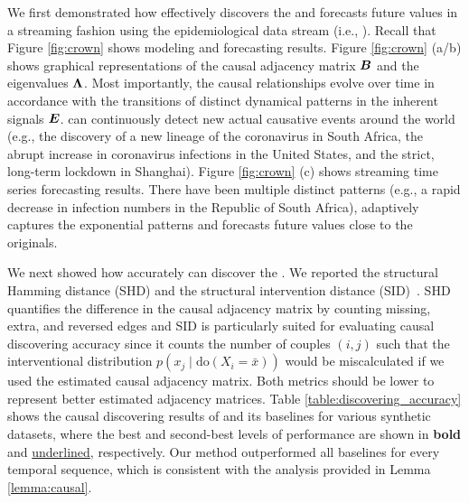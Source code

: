 We first demonstrated how effectively \method discovers the \relation and forecasts future values in a streaming fashion
using the epidemiological data stream (i.e., \covid).
Recall that Figure \ref{fig:crown} shows \method modeling and forecasting results.
Figure \ref{fig:crown} (a/b) shows graphical representations of the causal adjacency matrix $\bm{B}$ and the eigenvalues $\bm{\Lambda}$.
Most importantly, the causal relationships evolve over time in accordance with
the transitions of distinct dynamical patterns in the inherent signals $\bm{E}$.
\method can continuously detect new actual causative events around the world
(e.g., the discovery of a new lineage of the coronavirus in South Africa,
the abrupt increase in coronavirus infections in the United States,
and the strict, long-term lockdown in Shanghai).
Figure \ref{fig:crown} (c) shows streaming time series forecasting results. There have been multiple distinct patterns (e.g., a rapid decrease in infection numbers in the Republic of South Africa), \method adaptively captures the exponential patterns and forecasts future values close to the originals.
\par\noindent
{}
We next showed how accurately \method can discover the \relation.
We reported the structural Hamming distance (SHD) and the structural intervention distance (SID)~\cite{peters2015structural}.
SHD quantifies the difference in the causal adjacency matrix by counting missing, extra, and reversed edges and
SID is particularly suited for evaluating causal discovering accuracy since it counts the number of couples $(i, j)$ such that the interventional distribution $p(x_j\mid\text{do}(X_i=\bar{x}))$ would be miscalculated if we used the estimated causal adjacency matrix.
Both metrics should be lower to represent better estimated adjacency matrices. 
Table \ref{table:discovering_accuracy} shows the causal discovering results of \method and its baselines for various synthetic datasets, where the best and second-best levels of performance are shown in \textbf{bold} and \underline{underlined}, respectively.
Our method outperformed all baselines for every temporal sequence, which is consistent with the analysis provided in Lemma \ref{lemma:causal}.
